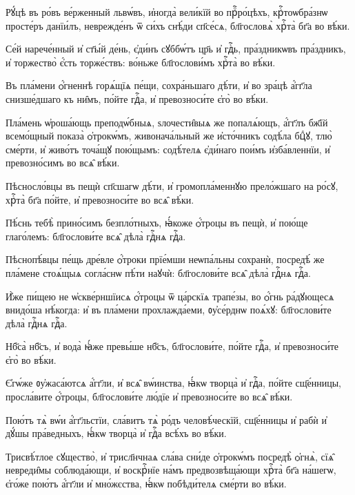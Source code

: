 \hKv Рꙋ́цѣ въ ро́въ ве́рженный львѡ́въ, и҆ногда̀ вели́кїй  во прⷪ҇ро́цѣхъ, крⷭ҇тоѡбра́знѡ просте́ръ данїи́лъ, неврежде́нъ ѿ  си́хъ снѣ́ди сп҃се́сѧ, бл҃гословѧ̀ хрⷭ҇та̀ бг҃а во вѣ́ки. 
%

\hKv Се́й нарече́нный и҆ ст҃ы́й де́нь, є҆ди́нъ сꙋббѡ́тъ цр҃ь  и҆ гдⷭ҇ь, пра́здникѡвъ пра́здникъ, и҆ торжество̀ є҆́сть торже́ствъ:  во́ньже бл҃гослови́мъ хрⷭ҇та̀ во вѣ́ки. 
%

\hKv Въ пла́мени ѻ҆́гненнѣ горѧ́щїѧ пе́щи, сохра́ньшаго  дѣ́ти, и҆ во зра́цѣ а҆́гг҃ла снизше́дшаго къ ни̑мъ, по́йте гдⷭ҇а,  и҆ превозноси́те є҆го̀ во вѣ́ки.  
%

\hKv Пла́мень ѡ҆роша́ющь преподѡ́бныѧ,  ѕлочести̑выѧ же попалѧ́ющъ, а҆́гг҃лъ бж҃їй всемо́щный показа̀  ѻ҆трокѡ́мъ, живонача́льный же и҆сто́чникъ содѣ́ла бцⷣꙋ, тлю̀  сме́рти, и҆ живо́тъ точа́щꙋ пою́щымъ: содѣ́телѧ є҆ди́наго пои́мъ  и҆зба́вленнїи, и҆ превозно́симъ во всѧ̑ вѣ́ки. 
%

\hKv Пѣсносло́вцы въ пещѝ сп҃сшагѡ дѣ́ти, и҆ громопла́меннꙋю  прело́жшаго на ро́сꙋ, хрⷭ҇та̀ бг҃а по́йте, и҆ превозноси́те во всѧ̑  вѣ́ки. 

\hKv Пѣ́снь тебѣ̀ прино́симъ безпло́тныхъ, ꙗ҆́коже ѻ҆́троцы въ  пещѝ, и҆ пою́ще глаго́лемъ: бл҃гослови́те всѧ̑ дѣла̀ гдⷭ҇нѧ гдⷭ҇а.

\hKv Пѣснопѣ́вцы пе́щь дре́вле ѻ҆́троки прїе́мши неѡпа́льны  сохранѝ, посредѣ́ же пла́мене стоѧ́щыѧ согла́снѡ пѣ́ти наꙋчѝ:  бл҃гослови́те всѧ̑ дѣла̀ гдⷭ҇нѧ гдⷭ҇а. 

\hKv И҆̀же пи́щею не ѡ҆скве́рншїисѧ ѻ҆́троцы ѿ ца́рскїѧ трапе́зы,  во ѻ҆́гнь ра́дꙋющесѧ внидо́ша   нѣ́когда: и҆ въ пла́мени прохлажда́еми, ᲂу҆се́рднѡ поѧ́хꙋ:  бл҃гослови́те дѣла̀ гдⷭ҇нѧ гдⷭ҇а. 

\hKv Нб҃са̀ нб҃съ, и҆ вода̀ ꙗ҆́же превы́ше нб҃съ, бл҃гослови́те,  по́йте гдⷭ҇а, и҆ превозноси́те є҆го̀ во вѣ́ки. 
%

\hKv Є҆гѡ́же ᲂу҆жаса́ютсѧ а҆́гг҃ли, и҆ всѧ̑ вѡ́инства, ꙗ҆́кѡ  творца̀ и҆ гдⷭ҇а, по́йте сщ҃е́нницы, просла́вите ѻ҆́троцы,  бл҃гослови́те лю́дїе и҆ превозноси́те во всѧ̑ вѣ́ки. 

\hKv Пою́тъ тѧ̀ вѡ́и а҆́гг҃льстїи, сла́витъ тѧ̀ ро́дъ человѣ́ческїй,  сщ҃е́нницы и҆ рабѝ и҆ дꙋ́шы пра́ведныхъ, ꙗ҆́кѡ творца̀ и҆ гдⷭ҇а  всѣ́хъ во вѣ́ки. 

\hKv Трисвѣ́тлое сꙋщество̀, и҆ трисл҃нчнаѧ сла́ва сни́де ѻ҆трокѡ́мъ  посредѣ̀ ѻ҆гнѧ̀, сїѧ̑ невреди̑мы соблюда́ющи, и҆ воскрⷭ҇нїе на́мъ  предвозвѣща́ющи хрⷭ҇та̀ бг҃а на́шегѡ, є҆го́же пою́тъ а҆́гг҃ли и҆  мно́жєства, ꙗ҆́кѡ побѣди́телѧ сме́рти во вѣ́ки. 

